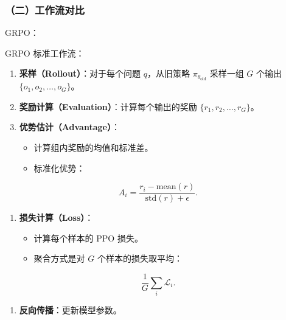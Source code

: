 \hypertarget{ux4e8cux5de5ux4f5cux6d41ux5bf9ux6bd4}{%
\subsubsection{（二）工作流对比}\label{ux4e8cux5de5ux4f5cux6d41ux5bf9ux6bd4}}

GRPO：

GRPO 标准工作流：

\begin{enumerate}
\def\labelenumi{\arabic{enumi}.}
\tightlist
\item
  \textbf{采样（Rollout）}：对于每个问题 \(q\)，从旧策略 \(\pi_{\theta_{\mathrm{old}}}\) 采样一组 \(G\) 个输出 \(\{o_1,o_2,\ldots,o_G\}\)。
\item
  \textbf{奖励计算（Evaluation）}：计算每个输出的奖励 \(\{r_1,r_2,\ldots,r_G\}\)。
\item
{}
  \textbf{优势估计（Advantage）}：

  \begin{itemize}
  \tightlist
  \item
    计算组内奖励的均值和标准差。
  \item
{}
    标准化优势：
  \end{itemize}
\end{enumerate}

\[
A_i
=
\frac{r_i-\mathrm{mean}(r)}
{\mathrm{std}(r)+\epsilon}.
\]

\begin{enumerate}
\def\labelenumi{\arabic{enumi}.}
\setcounter{enumi}{3}
\tightlist
\item
{}
  \textbf{损失计算（Loss）}：

  \begin{itemize}
  \tightlist
  \item
    计算每个样本的 PPO 损失。
  \item
{}
    聚合方式是对 \(G\) 个样本的损失取平均：
  \end{itemize}
\end{enumerate}

\[
\frac{1}{G}\sum_i \mathcal{L}_i.
\]

\begin{enumerate}
\def\labelenumi{\arabic{enumi}.}
\setcounter{enumi}{4}
\tightlist
\item
  \textbf{反向传播}：更新模型参数。
\end{enumerate}

